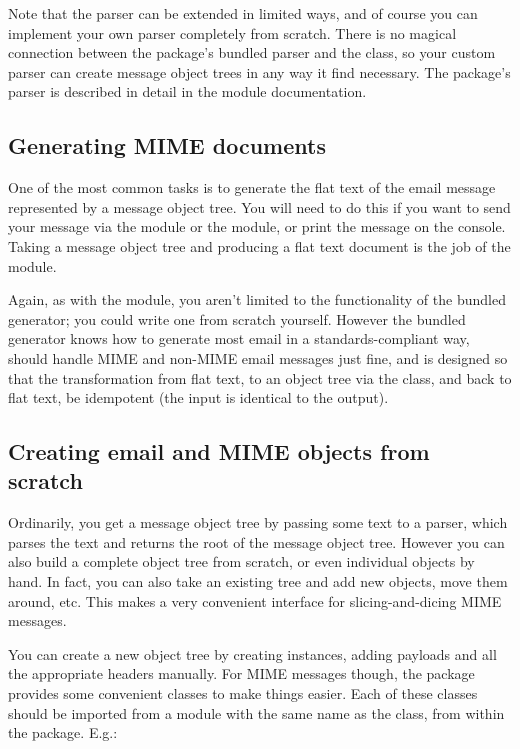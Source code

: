 Note that the parser can be extended in limited ways, and of course
you can implement your own parser completely from scratch.  There is
no magical connection between the  package's bundled
parser and the
 class, so your custom parser can create message object
trees in any way it find necessary.  The  package's
parser is described in detail in the  module
documentation.

\subsection{Generating MIME documents}
One of the most common tasks is to generate the flat text of the email
message represented by a message object tree.  You will need to do
this if you want to send your message via the 
module or the  module, or print the message on the
console.  Taking a message object tree and producing a flat text
document is the job of the  module.

Again, as with the  module, you aren't limited
to the functionality of the bundled generator; you could write one
from scratch yourself.  However the bundled generator knows how to
generate most email in a standards-compliant way, should handle MIME
and non-MIME email messages just fine, and is designed so that the
transformation from flat text, to an object tree via the
 class,
and back to flat text, be idempotent (the input is identical to the
output).

\subsection{Creating email and MIME objects from scratch}

Ordinarily, you get a message object tree by passing some text to a
parser, which parses the text and returns the root of the message
object tree.  However you can also build a complete object tree from
scratch, or even individual  objects by hand.  In fact,
you can also take an existing tree and add new 
objects, move them around, etc.  This makes a very convenient
interface for slicing-and-dicing MIME messages.

You can create a new object tree by creating 
instances, adding payloads and all the appropriate headers manually.
For MIME messages though, the  package provides some
convenient classes to make things easier.  Each of these classes
should be imported from a module with the same name as the class, from
within the  package.  E.g.:

